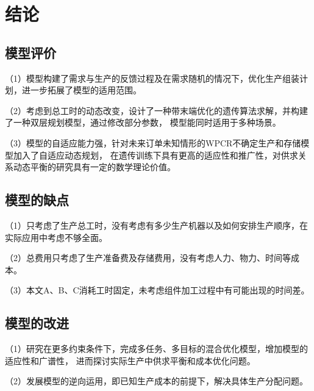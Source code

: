 %
%
%
%
%

\chapter{结论}

\section{模型评价}

（1）模型构建了需求与生产的反馈过程及在需求随机的情况下，优化生产组装计划，进一步拓展了模型的适用范围。

（2）考虑到总工时的动态改变，设计了一种带末端优化的遗传算法求解，并构建了一种双层规划模型，通过修改部分参数，
模型能同时适用于多种场景。

（3）模型的自适应能力强，针对未来订单未知情形的WPCR不确定生产和存储模型加入了自适应动态规划，
在遗传训练下具有更高的适应性和推广性，对供求关系动态平衡的研究具有一定的数学理论价值。

\section{模型的缺点}

（1）只考虑了生产总工时，没有考虑有多少生产机器以及如何安排生产顺序，在实际应用中考虑不够全面。

（2）总费用只考虑了生产准备费及存储费用，没有考虑人力、物力、时间等成本。

（3）本文A、B、C消耗工时固定，未考虑组件加工过程中有可能出现的时间差。

\section{模型的改进}

（1）研究在更多约束条件下，完成多任务、多目标的混合优化模型，增加模型的适应性和广谱性，
进而探讨实际生产中供求平衡和成本优化问题。

（2）发展模型的逆向运用，即已知生产成本的前提下，解决具体生产分配问题。